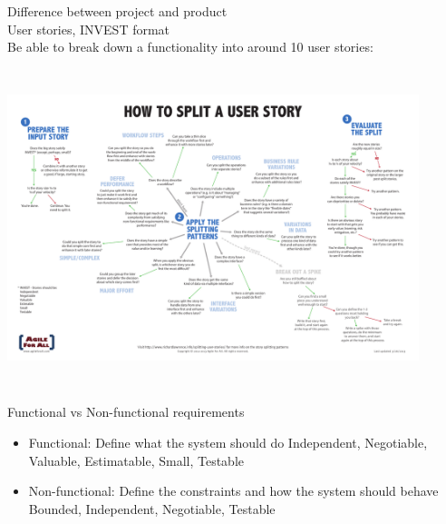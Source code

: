\documentclass[10pt]{article}
\begin{document}
Difference between project and product\\
User stories, INVEST format\\
Be able to break down a functionality into around 10 user stories:\\
\includegraphics[width=12cm, height=10cm]{userstories-flowchart}\\
Functional vs Non-functional requirements
\begin{itemize}
\item Functional:
Define what the system should do
Independent, Negotiable, Valuable, Estimatable, Small, Testable
\item Non-functional:
Define the constraints and how the system should behave
Bounded, Independent, Negotiable, Testable
\end{itemize}
\end{document}
